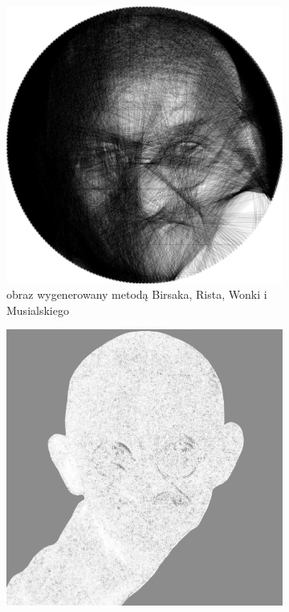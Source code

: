 \documentclass[a4paper, 12pt, polish, twoside]{extreport}
\begin{document}
\begin{figure}[H]
\begin{subfigure}{0.24\textwidth}
        \includegraphics[width = \textwidth]{img/6-comp/gandhi_birsak_.png}
        \caption{obraz wygenerowany metodą Birsaka, Rista, Wonki i Musialskiego}
        \label{comp-comp-gandhi-mandela-b}
    \end{subfigure}
    \begin{subfigure}{0.24\textwidth}
        \centering
        \includegraphics[width = \textwidth]{img/6-comp/gandhi_mask_c20_inv0_bg10_obj1_ed10.png}

\end{subfigure}
\end{figure}
\end{document}
